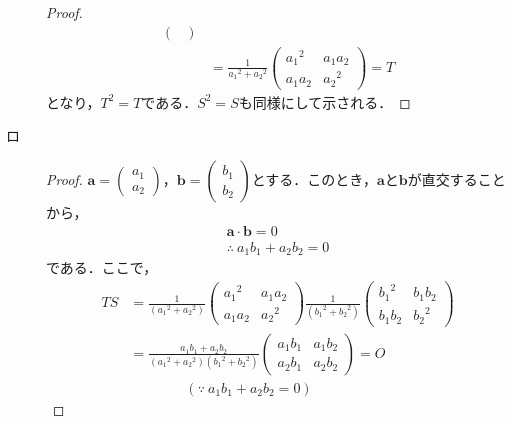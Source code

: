 \documentclass[uplatex,dvipdfmx,a4paper,11pt,fleqn]{jsarticle}
\begin{document}
\begin{leftbar}
\begin{description}
\begin{proof}
\begin{align*}
\begin{pmatrix}
        \end{pmatrix}
        \\
        &= \frac{1}{{a_1}^2+{a_2}^2}
        \begin{pmatrix}
            {a_1}^2 & a_1 a_2 \\
            a_1 a_2 & {a_2}^2
        \end{pmatrix}
        =T
    \end{align*}
    となり，$T^2=T$である．$S^2=S$も同様にして示される．
\end{proof}
\item[ロ]
    \begin{proof}
        $\bm{a}=
        \begin{pmatrix}
            a_1 \\
            a_2
        \end{pmatrix}
        $，$\bm{b}=
        \begin{pmatrix}
            b_1 \\
            b_2
        \end{pmatrix}
        $とする．このとき，$\bm{a}$と$\bm{b}$が直交することから，
        \begin{gather*}
            \bm{a} \cdot \bm{b}=0 \\
            \therefore ~a_1 b_1 + a_2 b_2 =0
        \end{gather*}
        である．ここで，
        \begin{align*}
            TS & = \frac{1}{({a_1}^2 +{a_2}^2)}
            \begin{pmatrix}
                {a_1}^2 & a_1 a_2 \\
                a_1 a_2 & {a_2}^2
            \end{pmatrix}
            \frac{1}{({b_1}^2 +{b_2}^2)}
            \begin{pmatrix}
                {b_1}^2 & b_1 b_2 \\
                b_1 b_2 & {b_2}^2
            \end{pmatrix}
            \\
            &=\frac{a_1 b_1 + a_2 b_2}{({a_1}^2 +{a_2}^2)({b_1}^2 +{b_2}^2)}
            \begin{pmatrix}
                a_1 b_1 & a_1 b_2 \\
                a_2 b_1 & a_2 b_2
            \end{pmatrix}
            =O \\
            & \qquad \qquad  (\because ~ a_1 b_1 + a_2 b_2 =0)
        \end{align*}

\end{proof}
\end{description}
\end{leftbar}
\end{document}
